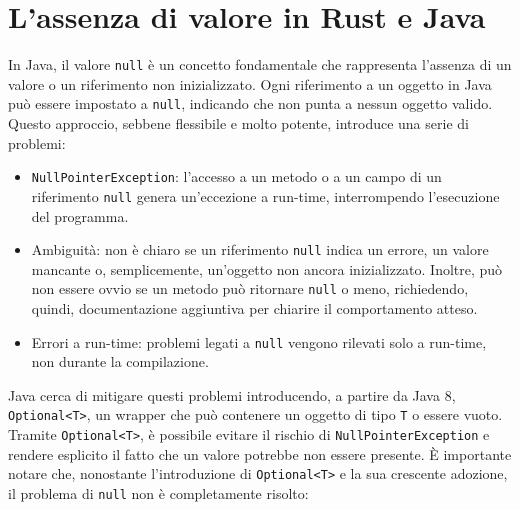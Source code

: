 \section{L'assenza di valore in Rust e Java}
In Java, il valore \texttt{null} è un concetto fondamentale che rappresenta l'assenza di un valore o un riferimento non inizializzato. Ogni riferimento a un oggetto in Java può essere impostato a \texttt{null}, indicando che non punta a nessun oggetto valido. Questo approccio, sebbene flessibile e molto potente, introduce una serie di problemi: 
\begin{itemize}
    \item \texttt{NullPointerException}: l'accesso a un metodo o a un campo di un riferimento \texttt{null} genera un'eccezione a run-time, interrompendo l'esecuzione del programma. 
    \item Ambiguità: non è chiaro se un riferimento \texttt{null} indica un errore, un valore mancante o, semplicemente, un'oggetto non  ancora inizializzato. Inoltre, può non essere ovvio se un metodo può ritornare \texttt{null} o meno, richiedendo, quindi, documentazione aggiuntiva per chiarire il comportamento atteso.
    \item Errori a run-time: problemi legati a \texttt{null} vengono rilevati solo a run-time, non durante la compilazione. 
\end{itemize}
Java cerca di mitigare questi problemi introducendo, a partire da Java 8, \texttt{Optional<T>}, un wrapper che può contenere un oggetto di tipo \texttt{T} o essere vuoto. Tramite \texttt{Optional<T>}, è possibile evitare il rischio di \texttt{NullPointerException} e rendere esplicito il fatto che un valore potrebbe non essere presente. È importante notare che, nonostante l'introduzione di \texttt{Optional<T>} e la sua crescente adozione, il problema di \texttt{null} non è completamente risolto:
